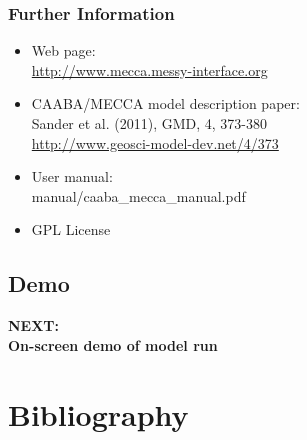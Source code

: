 \documentclass[t]{beamer}
\begin{document}
\begin{frame}

  \frametitle{Further Information}

  \begin{itemize}%
  \item Web page:\\
    \url{http://www.mecca.messy-interface.org}
  \item CAABA/MECCA model description paper:\\
    Sander et al. (2011), GMD, 4, 373-380\\
    \url{http://www.geosci-model-dev.net/4/373}
  \item User manual:\\
    manual/caaba\_mecca\_manual.pdf
  \item GPL License
  \end{itemize}

\end{frame}


\subsection{Demo}

\begin{frame}

  \vfill
  \begin{center}
    {\Large\bf NEXT:\\[1cm]
    On-screen demo of model run}
  \end{center}
  \vfill

\end{frame}


\section*{Bibliography}

\def\newblock{}
\beamerdefaultoverlayspecification{}

\begin{frame}[shrink]

\end{frame}

\end{document}
